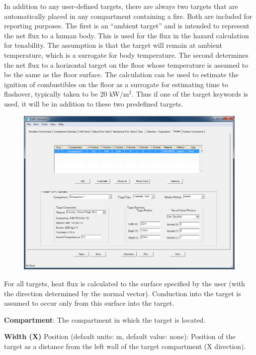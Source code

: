 In addition to any user-defined targets, there are always two targets that are automatically placed in any compartment containing a fire. Both are included for reporting purposes. The first is an “ambient target” and is intended to represent the net flux to a human body. This is used for the flux in the hazard calculation for tenability. The assumption is that the target will remain at ambient temperature, which is a surrogate for body temperature. The second determines the net flux to a horizontal target on the floor whose temperature is assumed to be the same as the floor surface. The calculation can be used to estimate the ignition of combustibles on the floor as a surrogate for estimating time to flashover, typically taken to be 20 kW/m$^2$. Thus if one of the target keywords is used, it will be in addition to these two predefined targets.

\begin{figure}[h!]
\begin{center}
\includegraphics[width=6.5in]{FIGURES/Input_File/Target_Tab}
\end{center}
\end{figure}

For all targets, heat flux is calculated to the surface specified by the user (with the direction determined by the normal vector). Conduction into the target is assumed to occur only from this surface into the target.


\textbf{Compartment}: The compartment in which the target is located.

\textbf{Width (X)} Position (default units: m, default value: none): Position of the target as a distance from the left wall of the target compartment (X direction).


